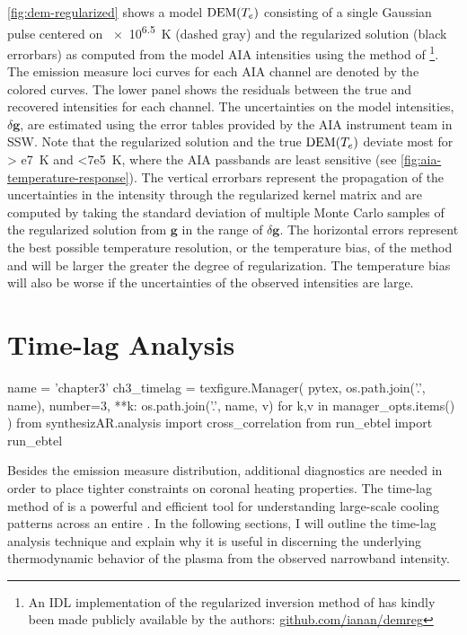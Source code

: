 \autoref{fig:dem-regularized} shows a model $\textup{DEM}(T_e)$ consisting of a single Gaussian pulse centered on \SI{e6.5}{\kelvin} (dashed gray) and the  regularized solution (black errorbars) as computed from the model AIA intensities using the method of \citet{hannah_differential_2012}\footnote{An  IDL implementation of the regularized inversion method of \citet{hannah_differential_2012} has kindly been made publicly available by the authors: \href{https://github.com/ianan/demreg}{github.com/ianan/demreg}}. The emission measure loci curves for each AIA channel are denoted by the colored curves. The lower panel shows the residuals between the true and recovered intensities for each channel. The uncertainties on the model intensities, $\delta\mathbf{g}$, are estimated using the error tables provided by the AIA instrument team in SSW. Note that the regularized solution and the true $\textup{DEM}(T_e)$ deviate most for \SI{> e7}{\kelvin} and \SI{<7e5}{\kelvin}, where the AIA passbands are least sensitive (see \autoref{fig:aia-temperature-response}). The vertical errorbars represent the propagation of the uncertainties in the intensity through the regularized kernel matrix and are computed by taking the standard deviation of multiple Monte Carlo samples of the regularized solution from $\mathbf{g}$ in the range of $\delta\mathbf{g}$. The horizontal errors represent the best possible temperature resolution, or the temperature bias, of the method and will be larger the greater the degree of regularization. The temperature bias will also be worse if the uncertainties of the observed intensities are large.

\section{Time-lag Analysis}\label{sec:timelag}

\begin{pycode}
name = 'chapter3'
ch3_timelag = texfigure.Manager(
    pytex,
    os.path.join('.', name),
    number=3,
    **{k: os.path.join('.', name, v) for k,v in manager_opts.items()}
)
from synthesizAR.analysis import cross_correlation
from run_ebtel import run_ebtel
\end{pycode}

Besides the emission measure distribution, additional diagnostics are needed in order to place tighter constraints on coronal heating properties. The time-lag method of \citet{viall_evidence_2012} is a powerful and efficient tool for understanding large-scale cooling patterns across an entire \AR{}. In the following sections, I will outline the time-lag analysis technique and explain why it is useful in discerning the underlying thermodynamic behavior of the plasma from the observed narrowband intensity. 

